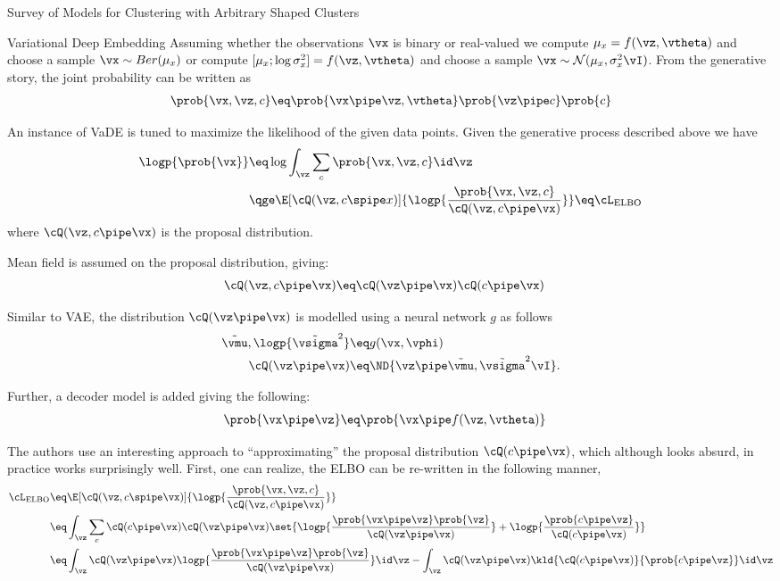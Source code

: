\documentclass{article}
\begin{document}
\begin{psection}{Survey of Models for Clustering with Arbitrary Shaped Clusters}
\begin{psubsection}{Variational Deep Embedding}
		Assuming whether the observations $\vx$ is binary or real-valued we compute $\mu_x = f(\vz, \vtheta)$ and choose a sample $\vx \sim Ber(\mu_x)$ or compute $[\mu_x;\log\sigma^2_x] = f(\vz,\vtheta)$ and choose a sample $\vx \sim \mathcal{N}(\mu_x,\sigma^2_x\vI)$. From the generative story, the joint probability can be written as
		\begin{align*}
			\prob{\vx, \vz, c} \eq \prob{\vx \pipe \vz, \vtheta} \prob{\vz \pipe c} \prob{c}
		\end{align*}

		An instance of VaDE is tuned to maximize the likelihood of the given data points. Given the generative process described above we have
		\begin{align*}
			\logp{\prob{\vx}} &\eq \log{\int_\vz \sum_c \prob{\vx, \vz, c} \id \vz} \\
			&\qge \E[\cQ(\vz, c \spipe x)]{\logp{\frac{\prob{\vx, \vz, c}}{\cQ(\vz, c \pipe \vx)}}} \eq \cL_{\text{ELBO}}
		\end{align*}
		where $\cQ(\vz, c \pipe \vx)$ is the proposal distribution.

		Mean field is assumed on the proposal distribution, giving:
		\begin{align*}
			\cQ(\vz, c \pipe \vx) &\eq \cQ(\vz \pipe \vx) \cQ(c \pipe \vx)
		\end{align*}

		Similar to VAE, the distribution $\cQ(\vz \pipe \vx)$ is modelled using a neural network $g$ as follows
		\begin{align*}
			\tilde{\vmu}, \logp{\tilde{\vsigma}^2} &\eq g(\vx, \vphi) \\
			\cQ(\vz \pipe \vx) &\eq \ND{\vz \pipe \tilde{\vmu}, \tilde{\vsigma}^2 \vI}.
		\end{align*}

		Further, a decoder model is added giving the following:
		\begin{align*}
			\prob{\vx \pipe \vz} &\eq \prob{\vx \pipe f(\vz, \vtheta)}
		\end{align*}

		The authors use an interesting approach to ``approximating'' the proposal distribution $\cQ(c \pipe \vx)$, which although looks absurd, in practice works surprisingly well. First, one can realize, the ELBO can be re-written in the following manner,
		\begin{align*}
			\cL_{\text{ELBO}} &\eq 	\E[\cQ(\vz, c \spipe \vx)]{\logp{\frac{\prob{\vx, \vz, c}}{\cQ(\vz, c \pipe \vx)}}} \\
			&\eq					\int_{\vz} \sum_{c} \cQ(c \pipe \vx) \cQ(\vz \pipe \vx) \set{\logp{\frac{\prob{\vx \pipe \vz} \prob{\vz}}{\cQ(\vz \pipe \vx)}} + \logp{\frac{\prob{c \pipe \vz}}{\cQ(c \pipe \vx)}}} \\
			&\eq \int_{\vz} \cQ(\vz \pipe \vx) \logp{\frac{\prob{\vx \pipe \vz} \prob{\vz}}{\cQ(\vz \pipe \vx)}} \id \vz - \int_{\vz} \cQ(\vz \pipe \vx) \kld{\cQ(c \pipe \vx)}{\prob{c \pipe \vz}} \id \vz
		\end{align*}


\end{psubsection}
\end{psection}
\end{document}
